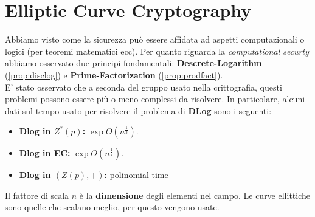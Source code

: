 \chapter{Elliptic Curve Cryptography}
Abbiamo visto come la sicurezza può essere affidata ad aspetti computazionali o logici (per teoremi matematici ecc). Per quanto riguarda la \textit{computational securty} abbiamo osservato due principi fondamentali: \textbf{Descrete-Logarithm} (\cref{prop:disclog}) e \textbf{Prime-Factorization} (\cref{prop:prodfact}).\\
E' stato osservato che a seconda del gruppo usato nella crittografia, questi problemi possono essere più o meno complessi da risolvere. In particolare, alcuni dati sul tempo usato per risolvere il problema di \textbf{DLog} sono i seguenti:
\begin{itemize}
    \item \textbf{Dlog in $Z^*(p)$:} $\exp{O(n^{\frac{1}{3}})}$.
    \item \textbf{Dlog in EC:} $\exp{O(n^{\frac{1}{2}})}$.
    \item \textbf{Dlog in $(Z(p),+)$:} polinomial-time
\end{itemize}
\begin{remark}
Il fattore di scala $n$ è la \textbf{dimensione} degli elementi nel campo. Le curve ellittiche sono quelle che scalano meglio, per questo vengono usate.
\end{remark}
